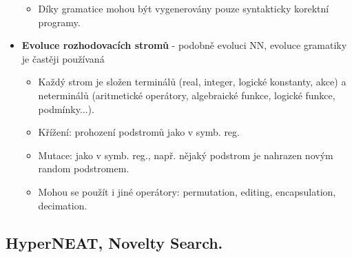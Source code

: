 \documentclass[a4paper,hidelinks]{article}
\begin{document}
\begin{itemize}
\begin{itemize}
            \item Díky gramatice mohou být vygenerovány pouze syntakticky korektní programy.
        \end{itemize}
    \item \textbf{Evoluce rozhodovacích stromů} - podobně evoluci NN, evoluce gramatiky je častěji používaná
        \begin{itemize}
            \item Každý strom je složen terminálů (real, integer, logické konstanty, akce) a neterminálů (aritmetické operátory, algebraické funkce, logické funkce, podmínky...).
            \item Křížení: prohození podstromů jako v symb. reg.
            \item Mutace: jako v symb. reg., např. nějaký podstrom je nahrazen novým random podstromem.
            \item Mohou se použít i jiné operátory: permutation, editing, encapsulation, decimation.
        \end{itemize}
\end{itemize}


\subsection{HyperNEAT, Novelty Search.}
\end{document}
